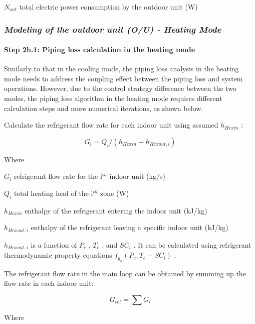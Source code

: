 \(N_{out}\) total electric power consumption by the outdoor unit (W)

\subsubsection{\texorpdfstring{\emph{Modeling of the outdoor unit (O/U) - Heating Mode}}{Modeling of the outdoor unit (O/U) - Heating Mode}}\label{modeling-of-the-outdoor-unit-ou---heating-mode}

\paragraph{Step 2h.1: Piping loss calculation in the heating mode}\label{step-2h.1-piping-loss-calculation-in-the-heating-mode}

Similarly to that in the cooling mode, the piping loss analysis in the heating mode needs to address the coupling effect between the piping loss and system operations. However, due to the control strategy difference between the two modes, the piping loss algorithm in the heating mode requires different calculation steps and more numerical iterations, as shown below.

Calculate the refrigerant flow rate for each indoor unit using assumed \(h_{Hexin}\) :

\begin{equation}
G_i = Q_i/(h_{Hexin}-h_{Hexout,i})
\end{equation}

Where

\(G_i\) refrigerant flow rate for the i\(^{th}\) indoor unit (kg/s)

\(Q_i\) total heating load of the i\(^{th}\) zone (W)

\(h_{Hexin}\) enthalpy of the refrigerant entering the indoor unit (kJ/kg)

\(h_{Hexout,i}\) enthalpy of the refrigerant leaving a specific indoor unit (kJ/kg)

\(h_{Hexout,i}\) is a function of \(P_c\) , \(T_c\) , and \(SC_i\) . It can be calculated using refrigerant thermodynamic property equations \(f_{g_h}(P_c,T_c-SC_i)\) .

The refrigerant flow rate in the main loop can be obtained by summing up the flow rate in each indoor unit:

\begin{equation}
G_{tot} = \sum{G_i}
\end{equation}

Where

